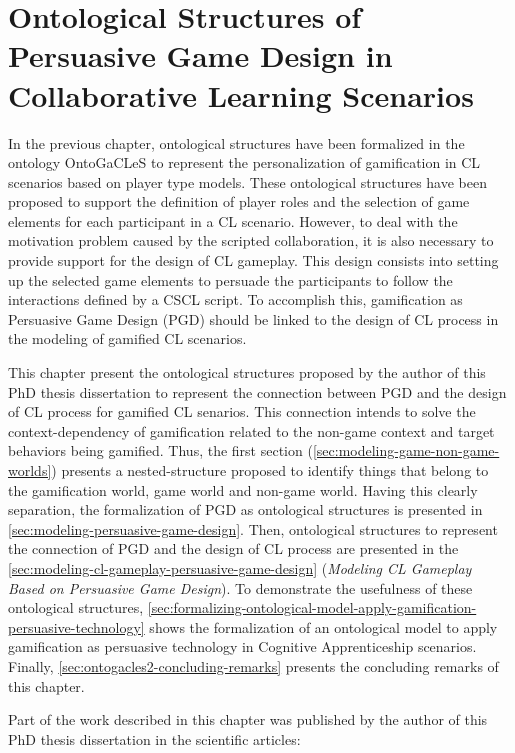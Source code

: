 \chapter[Ontological Structures of Persuasive Game Design in CL Scenarios]{Ontological Structures of Persuasive Game Design in Collaborative Learning Scenarios}
\label{chapter:ontogacles-2}

In the previous chapter, ontological structures have been formalized in the ontology OntoGaCLeS to represent the personalization of gamification in CL scenarios based on player type models. These ontological structures have been proposed to support the definition of player roles and the selection of game elements for each participant in a CL scenario. However, to deal with the motivation problem caused by the scripted collaboration, it is also necessary to provide support for the design of CL gameplay. This design consists into setting up the selected game elements to persuade the participants to follow the interactions defined by a CSCL script. To accomplish this, gamification as Persuasive Game Design (PGD) should be linked to the design of CL process in the modeling of gamified CL scenarios.

This chapter present the ontological structures proposed by the author of this PhD thesis dissertation to represent the connection between PGD and the design of CL process for gamified CL senarios. This connection intends to solve the context-dependency of gamification related to the non-game context and target behaviors being gamified. Thus, the first section (\autoref{sec:modeling-game-non-game-worlds}) presents a nested-structure proposed to identify things that belong to the gamification world, game world and non-game world. Having this clearly separation, the formalization of PGD as ontological structures is presented in \autoref{sec:modeling-persuasive-game-design}. Then, ontological structures to represent the connection of PGD and the design of CL process are presented in the \autoref{sec:modeling-cl-gameplay-persuasive-game-design} (\emph{Modeling CL Gameplay Based on Persuasive Game Design}). To demonstrate the usefulness of these ontological structures, \autoref{sec:formalizing-ontological-model-apply-gamification-persuasive-technology} shows the formalization of an ontological model to apply gamification as persuasive technology in Cognitive Apprenticeship scenarios. Finally, \autoref{sec:ontogacles2-concluding-remarks} presents the concluding remarks of this chapter.
 
Part of the work described in this chapter was published by the author of this PhD thesis dissertation in the scientific articles:

